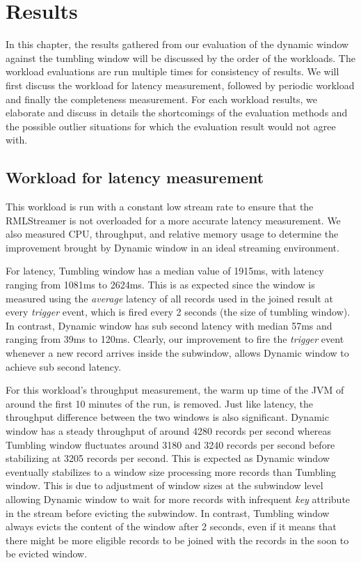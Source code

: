 \chapter{Results}%
\label{chap:Results}

In this chapter, the results gathered from our evaluation of the dynamic window against 
the tumbling window will be discussed by the order of the workloads. The workload 
evaluations are run multiple times for consistency of results. We will first 
discuss the workload for latency measurement, followed by periodic workload and 
finally the completeness measurement. For each workload results, we elaborate 
and discuss in details the shortcomings of the evaluation methods and the 
possible outlier situations for which the evaluation result would not agree with.



\section{Workload for latency measurement}%
\label{sec:Workload for latency measurement}

This workload is run with a constant low stream rate to ensure that 
the RMLStreamer is not overloaded for a more accurate latency measurement. We also measured 
CPU, throughput, and relative memory usage to determine the improvement brought by Dynamic window
in an ideal streaming environment.

For latency, Tumbling window has a median value of 1915ms, with latency ranging from 1081ms to 2624ms. 
This is as expected since the window is measured using the \emph{average} latency of all records used 
in the joined result at every \emph{trigger} event, which is fired every 2 seconds (the size of tumbling window).
In contrast, Dynamic window has sub second latency with median 57ms and ranging from 39ms to 120ms. Clearly, 
our improvement to fire the \emph{trigger} event whenever a new record arrives inside the subwindow, allows 
Dynamic window to achieve sub second latency. 

For this workload's throughput measurement, the warm up time of the JVM of around the first 10 minutes of the run, 
is removed. 
Just like latency, the throughput difference between the two windows is also significant. Dynamic window has a 
steady throughput of around 4280 records per second whereas Tumbling window fluctuates around 
3180 and 3240 records per second before stabilizing at 3205 records per second. This is expected as Dynamic 
window eventually stabilizes to a window size processing more records than Tumbling window. This is 
due to adjustment of window sizes at the subwindow level allowing Dynamic window to wait for more records 
with infrequent \emph{key} attribute in the stream before evicting the subwindow. In contrast, Tumbling window 
always evicts the content of the window after 2 seconds, even if it means that there might be more 
eligible records to be joined with the records in the soon to be evicted window. 


